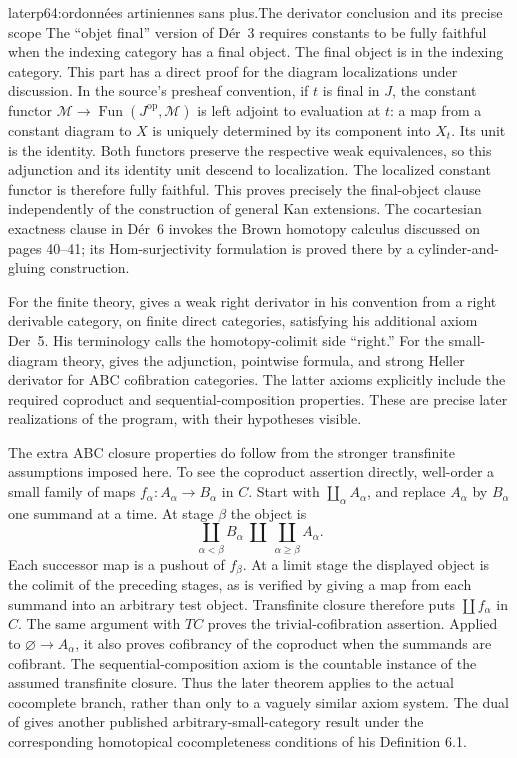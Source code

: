 \begin{dcomment}{later}{p64:ordonnées artiniennes sans plus.}{The derivator conclusion and its precise scope}
The ``objet final'' version of Dér~3 requires constants to be fully faithful when the indexing category has a final object. The final object is in the indexing category. This part has a direct proof for the diagram localizations under discussion. In the source's presheaf convention, if $t$ is final in $J$, the constant functor $\mathcal M\to\operatorname{Fun}(J^{\mathrm{op}},\mathcal M)$ is left adjoint to evaluation at $t$: a map from a constant diagram to $X$ is uniquely determined by its component into $X_t$. Its unit is the identity. Both functors preserve the respective weak equivalences, so this adjunction and its identity unit descend to localization. The localized constant functor is therefore fully faithful. This proves precisely the final-object clause independently of the construction of general Kan extensions. The cocartesian exactness clause in Dér~6 invokes the Brown homotopy calculus discussed on pages 40--41; its Hom-surjectivity formulation is proved there by a cylinder-and-gluing construction.

For the finite theory, \citet[Corollary 2.24]{Cisinski2010} gives a weak right derivator in his convention from a right derivable category, on finite direct categories, satisfying his additional axiom Der~5. His terminology calls the homotopy-colimit side ``right.'' For the small-diagram theory, \citet[Theorems 9.6.3, 9.6.5, and 10.3.2]{RadulescuBanu2009} gives the adjunction, pointwise formula, and strong Heller derivator for ABC cofibration categories. The latter axioms explicitly include the required coproduct and sequential-composition properties. These are precise later realizations of the program, with their hypotheses visible.

The extra ABC closure properties do follow from the stronger transfinite assumptions imposed here. To see the coproduct assertion directly, well-order a small family of maps $f_\alpha:A_\alpha\to B_\alpha$ in $C$. Start with $\coprod_\alpha A_\alpha$, and replace $A_\alpha$ by $B_\alpha$ one summand at a time. At stage $\beta$ the object is
\[
 \coprod_{\alpha<\beta}B_\alpha\ \amalg\
 \coprod_{\alpha\geq\beta}A_\alpha.
\]
Each successor map is a pushout of $f_\beta$. At a limit stage the displayed object is the colimit of the preceding stages, as is verified by giving a map from each summand into an arbitrary test object. Transfinite closure therefore puts $\coprod f_\alpha$ in $C$. The same argument with $TC$ proves the trivial-cofibration assertion. Applied to $\varnothing\to A_\alpha$, it also proves cofibrancy of the coproduct when the summands are cofibrant. The sequential-composition axiom is the countable instance of the assumed transfinite closure. Thus the later theorem applies to the actual cocomplete branch, rather than only to a vaguely similar axiom system. The dual of \citet[Corollary 6.21]{Cisinski2010} gives another published arbitrary-small-category result under the corresponding homotopical cocompleteness conditions of his Definition 6.1.


\end{dcomment}
